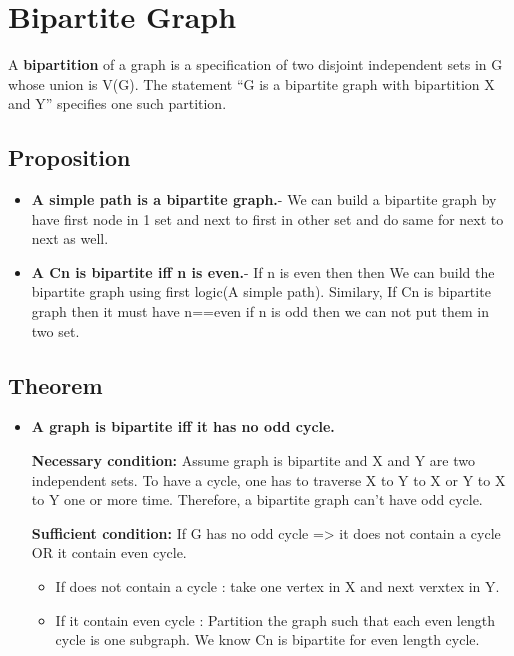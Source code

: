 \section{Bipartite Graph}
A \textbf{bipartition} of a graph is a specification of two disjoint
independent sets in G whose union is V(G). The statement
“G is a bipartite graph with bipartition X and Y” specifies
one such partition.

\subsection{Proposition}
\begin{itemize}
    \item \textbf{A simple path is a bipartite graph.}- We can build a bipartite graph by have first node in 1 set and next to first in other set and do same for next to next as well.
    \item \textbf{A Cn is bipartite iff n is even.}- If n is even then then We can build the bipartite graph using first logic(A simple path). Similary, If Cn is bipartite graph then it must have n==even if n is odd then we can not put them in two set.
\end{itemize}


\subsection{Theorem}
\begin{itemize}
    \item \textbf{A graph is bipartite iff it has no odd cycle.}
    

    \textbf{Necessary condition:} Assume graph is bipartite and X and
    Y are two independent sets. To have a cycle, one has to
    traverse X to Y to X or Y to X to Y one or more time. 
    Therefore, a bipartite graph can't have odd cycle.

    \textbf{Sufficient condition:} If G has no odd cycle => it does not
    contain a cycle OR it contain even cycle.
    \begin{itemize}
        \item If does not contain a cycle : take one vertex in X and next verxtex in Y.
        \item If it contain even cycle : Partition the
        graph such that each even length cycle is one subgraph.
        We know Cn is bipartite for even length cycle.
    \end{itemize}
\end{itemize}



